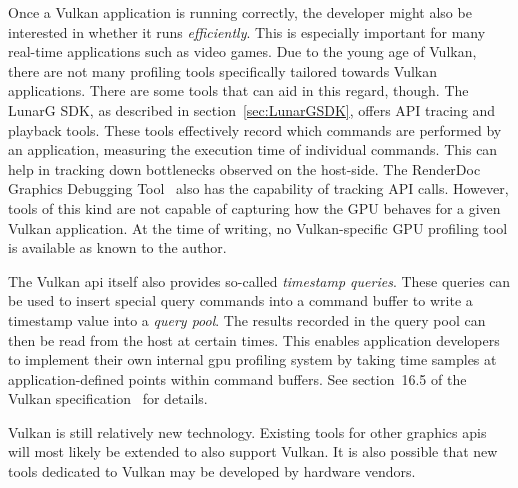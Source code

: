     Once a Vulkan application is running correctly, the developer might also be interested in whether it runs \textit{efficiently}.
    This is especially important for many real-time applications such as video games.
    Due to the young age of Vulkan, there are not many profiling tools specifically tailored towards Vulkan applications.
    There are some tools that can aid in this regard, though.
    The LunarG SDK, as described in section~\ref{sec:LunarGSDK}, offers API tracing and playback tools.
    These tools effectively record which commands are performed by an application, measuring the execution time of individual commands.
    This can help in tracking down bottlenecks observed on the host-side.
    The RenderDoc Graphics Debugging Tool~\cite{renderdoc} also has the capability of tracking API calls.
    However, tools of this kind are not capable of capturing how the GPU behaves for a given Vulkan application.
    At the time of writing, no Vulkan-specific GPU profiling tool is available as known to the author.


    The Vulkan \gls{api} itself also provides so-called \textit{timestamp queries}.
    These queries can be used to insert special query commands into a command buffer to write a timestamp value into a \textit{query pool}.
    The results recorded in the query pool can then be read from the host at certain times.
    This enables application developers to implement their own internal \acrshort{gpu} profiling system by taking time samples at application-defined points within command buffers.
    See section~16.5 of the Vulkan specification~\cite{vkspec} for details.

    Vulkan is still relatively new technology.
    Existing tools for other graphics \glspl{api} will most likely be extended to also support Vulkan.
    It is also possible that new tools dedicated to Vulkan may be developed by hardware vendors.
